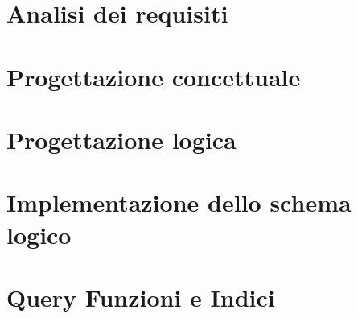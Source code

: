 \documentclass[a4paper,10pt]{report}
\begin{document}
    \tableofcontents

    
    
    \chapter{Analisi dei requisiti}
        

    \chapter{Progettazione concettuale}
        

    \chapter{Progettazione logica}
        

    \chapter{Implementazione dello schema logico}
        

    \chapter{Query Funzioni e Indici}
        
\end{document}
